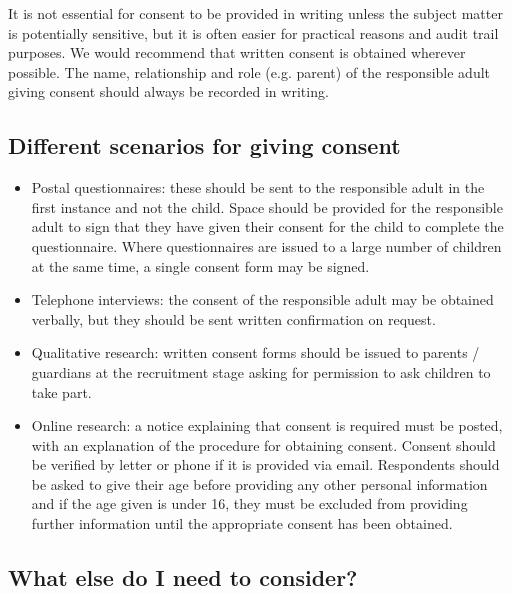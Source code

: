 It is not essential for consent to be provided in writing unless the subject matter is potentially sensitive, but it is often easier for practical reasons and audit trail purposes. We would recommend that written consent is obtained wherever possible. The name, relationship and role (e.g. parent) of the responsible adult giving consent should always be recorded in writing.

\subsection{Different scenarios for giving consent}

\begin{itemize}
	\item Postal questionnaires: these should be sent to the responsible adult in the first instance and not the child. Space should be provided for the responsible adult to sign that they have given their consent for the child to complete the questionnaire. Where questionnaires are issued to a large number of children at the same time, a single consent form may be signed.

	\item Telephone interviews: the consent of the responsible adult may be obtained verbally, but they should be sent written confirmation on request.

	\item Qualitative research: written consent forms should be issued to parents / guardians at the recruitment stage asking for permission to ask children to take part.

	\item Online research: a notice explaining that consent is required must be posted, with an explanation of the procedure for obtaining consent. Consent should be verified by letter or phone if it is provided via email. Respondents should be asked to give their age before providing any other personal information and if the age given is under 16, they must be excluded from providing further information until the appropriate consent has been obtained.
\end{itemize}

\subsection{What else do I need to consider?}

